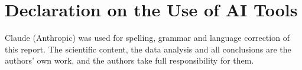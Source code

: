 \documentclass[10pt]{article}
\begin{document}
	
	
	
	
	
	
	\clearpage
	\printbibliography
	\listoffigures \listoftables
	\section*{Declaration on the Use of AI Tools}
	Claude (Anthropic) was used for spelling, grammar and language correction of
	this report. The scientific content, the data analysis and all conclusions are
	the authors' own work, and the authors take full responsibility for them.
\end{document}
